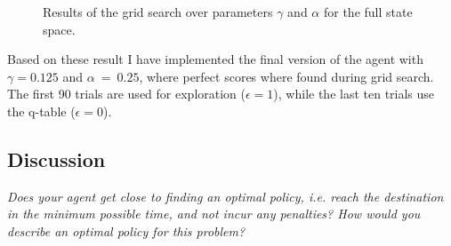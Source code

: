 \documentclass[11pt]{article}
\begin{document}
\begin{figure}[ht]
    \centering
    \caption{Results of the grid search over parameters $\gamma$ and $\alpha$ for the full state space.}
    \label{fig:full_state_space}
\end{figure}

Based on these result I have implemented the final version of the agent with $\gamma = 0.125$ and $\alpha~=~0.25$, where perfect scores where found during grid search. The first 90 trials are used for exploration ($\epsilon = 1$), while the last ten trials use the q-table ($\epsilon = 0$).

\subsection{Discussion}
\textit{Does your agent get close to finding an optimal policy, i.e. reach the destination in the minimum possible time, and not incur any penalties? How would you describe an optimal policy for this problem?}
\end{document}
